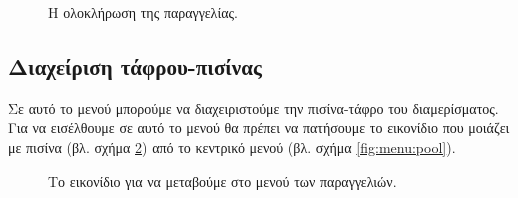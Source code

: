 \documentclass{assignment}
\begin{document}
\begin{figure}
\begin{center}
\caption{Η ολοκλήρωση της παραγγελίας.}
\label{fig:menu:order-payment}
\end{center}
\end{figure}

\newpage
\subsection{Διαχείριση τάφρου-πισίνας}
\label{pisina}

Σε αυτό το μενού μπορούμε να διαχειριστούμε την πισίνα-τάφρο του διαμερίσματος. Για να εισέλθουμε σε αυτό το μενού θα πρέπει να πατήσουμε το εικονίδιο που μοιάζει με πισίνα (βλ. σχήμα \ref{fig:icon:pool}) από το κεντρικό μενού (βλ. σχήμα \ref{fig:menu:pool}).

\begin{figure}
\begin{center}
\caption{Το εικονίδιο για να μεταβούμε στο μενού των παραγγελιών.}
\label{fig:icon:pool}
\end{center}
\end{figure}
\end{document}
